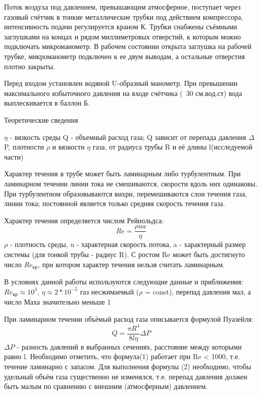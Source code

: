 \documentclass[12pt,a4paper]{article}
\begin{document}
\par Поток воздуха под давлением, превышающим атмосферное, поступает через газовый счётчик в тонкие металлические трубки под действием компрессора, интенсивность подачи регулируется краном К. Трубки снабжены съёмными заглушками на концах и рядом миллиметровых отверстий, к которым можно подключать микроманометр. В рабочем состоянии открыта заглушка на рабочей трубке, микроманометр подключен к ее двум выводам, а остальные отверстия плотно закрыты.
\par Перед входом установлен водяной U-образный манометр. При превышении максимального избыточного давления на входе счётчика (~30 см.вод.ст) вода выплескивается в баллон Б.
\begin{center}
\large{Теоретические сведения}
\end{center}
$\eta$ - вязкость среды \hfill \break
Q - объемный расход газа; Q зависит от перепада давления $\Delta$P, плотности $\rho$ и вязкости $\eta$ газа, от радиуса трубы R и её длины l(исследуемой части)
\par Характер течения в трубе может быть ламинарным либо турбулентным. При ламинарном течении линии тока не смешиваются, скорости вдоль них одинаковы. При турбулентном образовываются вихри, перемешиваются слои течения газа, линии тока; постоянной является только средняя скорость течения газа.
\par Характер течения определяется числом Рейнольдса:
\begin{equation}
Re=\frac{\rho{ua}}{\eta}
\end{equation}
$\rho$ - плотность среды, u - характерная скорость потока, a - характерный размер системы (для тонкой трубы - радиус R). С ростом Re может быть достигнуто число $Re_{\text{кр}}$, при котором характер течения нельзя считать ламинарным. 
\par В условиях данной работы используются следующие данные и приближения: $Re_{\text{кр}} \approx 10^3$, $\eta \approx 2*10^{-5}$ газ несжимаемый ($\rho$ = const), перепад давления мал, а число Маха значительно меньше 1
\par При ламинарном течении объёмый расход газа описывается формулой Пуазейля:
\begin{equation}
Q = \frac{\pi{R^4}}{8l\eta}\Delta{P}
\end{equation}
$\Delta{P}$ - разность давлений в выбранных сечениях, расстояние между которыми равно l. Необходимо отметить, что формула(1) работает при Re < 1000, т.е. течение ламинарно с запасом. Для выполнения формулы (2) необходимо, чтобы удельный объём газа существенно не изменялся, т.е. перепад давления должен быть малым по сравнению с внешним (атмосферным) давлением. 
\end{document}
